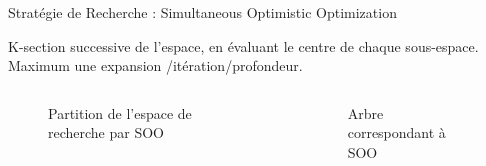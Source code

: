 \begin{frame}{Stratégie de Recherche : Simultaneous Optimistic Optimization}

    \vspace*{-8pt}
    \begin{block}{}
        K-section successive de l'espace, en évaluant le centre de chaque sous-espace. Maximum une expansion /itération/profondeur.
    \end{block}

    \vspace*{-14pt}
    \begin{columns}
        
        \begin{column}[t]{0.5\textwidth} 
            \begin{figure}
                \centering
                
                \vspace*{-1pt}
                \caption{Partition de l'espace de recherche par SOO}
            \end{figure} 
     
            \end{column}
                 
            \begin{column}[t]{0.5\textwidth}
                \begin{figure}
                    \centering
                    
                    \vspace*{-3pt}
                    \caption{Arbre correspondant à SOO}
                \end{figure} 
            \end{column}
                 
    \end{columns}

\end{frame}

